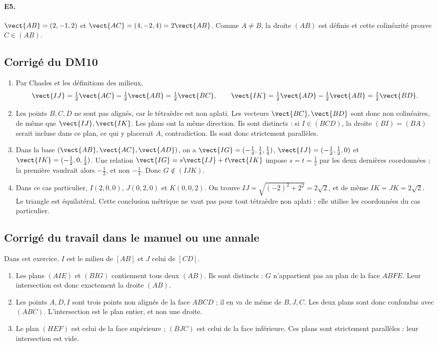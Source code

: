 \paragraph{E5.}$\vect{AB}=(2,-1,2)$ et $\vect{AC}=(4,-2,4)=2\vect{AB}$. Comme $A\ne B$, la droite $(AB)$ est définie et cette colinéarité prouve $C\in(AB)$.

\subsection{Corrigé du DM10}\begin{enumerate}
\item Par Chasles et les définitions des milieux,
\[\vect{IJ}=\tfrac12\vect{AC}-\tfrac12\vect{AB}=\tfrac12\vect{BC},\qquad \vect{IK}=\tfrac12\vect{AD}-\tfrac12\vect{AB}=\tfrac12\vect{BD}.\]
\item Les points $B,C,D$ ne sont pas alignés, car le tétraèdre est non aplati. Les vecteurs $\vect{BC},\vect{BD}$ sont donc non colinéaires, de même que $\vect{IJ},\vect{IK}$. Les plans ont la même direction. Ils sont distincts : si $I\in(BCD)$, la droite $(BI)=(BA)$ serait incluse dans ce plan, ce qui y placerait $A$, contradiction. Ils sont donc strictement parallèles.
\item Dans la base $(\vect{AB},\vect{AC},\vect{AD})$, on a $\vect{IG}=(-\frac{1}{4},\frac{1}{4},\frac{1}{4})$, $\vect{IJ}=(-\frac{1}{2},\frac{1}{2},0)$ et $\vect{IK}=(-\frac{1}{2},0,\frac{1}{2})$. Une relation $\vect{IG}=s\vect{IJ}+t\vect{IK}$ impose $s=t=\frac{1}{2}$ par les deux dernières coordonnées ; la première vaudrait alors $-\frac{1}{2}$, et non $-\frac{1}{4}$. Donc $G\notin(IJK)$.
\item Dans ce cas particulier, $I(2,0,0)$, $J(0,2,0)$ et $K(0,0,2)$. On trouve $IJ=\sqrt{(-2)^2+2^2}=2\sqrt2$, et de même $IK=JK=2\sqrt2$. Le triangle est équilatéral. Cette conclusion métrique ne vaut pas pour tout tétraèdre non aplati : elle utilise les coordonnées du cas particulier.
\end{enumerate}

\subsection{Corrigé du travail dans le manuel ou une annale}Dans cet exercice, $I$ est le milieu de $[AB]$ et $J$ celui de $[CD]$.
\begin{enumerate}
\item Les plans $(AIE)$ et $(BIG)$ contiennent tous deux $(AB)$. Ils sont distincts : $G$ n'appartient pas au plan de la face $ABFE$. Leur intersection est donc exactement la droite $(AB)$.
\item Les points $A,D,I$ sont trois points non alignés de la face $ABCD$ ; il en va de même de $B,J,C$. Les deux plans sont donc confondus avec $(ABC)$. L'intersection est le plan entier, et non une droite.
\item Le plan $(HEF)$ est celui de la face supérieure ; $(BJC)$ est celui de la face inférieure. Ces plans sont strictement parallèles : leur intersection est vide.
\end{enumerate}

\fi

